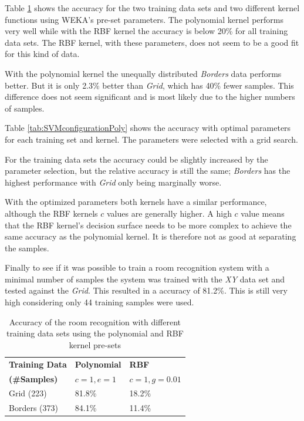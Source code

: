 Table \ref{tab:SVMconfigurationPresets} shows the accuracy for the two training data sets and two different kernel functions using WEKA's pre-set parameters. The polynomial kernel performs very well while with the RBF kernel the accuracy is below 20\% for all training data sets. The RBF kernel, with these parameters, does not seem to be a good fit for this kind of data.

With the polynomial kernel the unequally distributed \emph{Borders} data performs better. But it is only 2.3\% better than \emph{Grid}, which has 40\% fewer samples. This difference does not seem significant and is most likely due to the higher numbers of samples.

Table \ref{tab:SVMconfigurationPoly} shows the accuracy with optimal parameters for each training set and kernel. The parameters were selected with a grid search.

For the training data sets the accuracy could be slightly increased by the parameter selection, but the relative accuracy is still the same; \emph{Borders} has the highest performance with \emph{Grid} only being marginally worse.

With the optimized parameters both kernels have a similar performance, although the RBF kernels $c$ values are generally higher. A high $c$ value means that the RBF kernel's decision surface needs to be more complex to achieve the same accuracy as the polynomial kernel. It is therefore not as good at separating the samples. 

Finally to see if it was possible to train a room recognition system with a minimal number of samples the system was trained with the \emph{XY} data set and tested against the \emph{Grid}. This resulted in a accuracy of 81.2\%. This is still very high considering only 44 training samples were used.



\begin{table}

\centering
\begin{tabular}{l l l}
\toprule
\textbf{Training Data}&\textbf{Polynomial}&\textbf{RBF}\\
\textbf{(\#Samples)}&$c=1,e=1$&$c=1,g=0.01$\\
\midrule
Grid (223)&81.8\%&18.2\%\\
Borders (373)&84.1\%&11.4\%\\
\bottomrule
\end{tabular}
\caption[Room recognition - SVM pre-sets]{Accuracy of the room recognition with different training data sets using the polynomial and RBF kernel pre-sets}
\label{tab:SVMconfigurationPresets}
\end{table}

